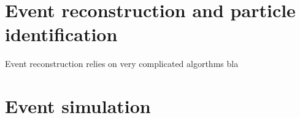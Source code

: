 \FloatBarrier
\chapter{Event reconstruction and particle identification}

Event reconstruction relies on very complicated algorthms bla


\FloatBarrier
\chapter{Event simulation}
